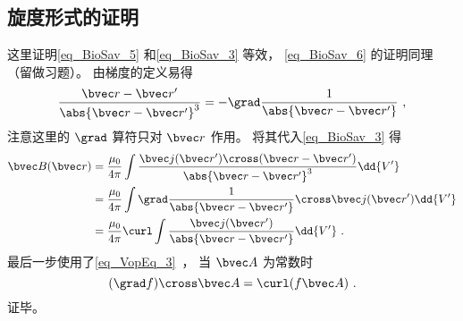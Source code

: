\subsection{旋度形式的证明}
这里证明\autoref{eq_BioSav_5} 和\autoref{eq_BioSav_3} 等效， \autoref{eq_BioSav_6} 的证明同理（留做习题）。 由梯度的定义易得
\begin{equation}
\frac{\bvec r - \bvec r'}{\abs{\bvec r - \bvec r'}^3} = -\grad \frac{1}{\abs{\bvec r - \bvec r'}}~,
\end{equation}
注意这里的 $\grad$ 算符只对 $\bvec r $ 作用。 将其代入\autoref{eq_BioSav_3} 得
\begin{equation}
\begin{aligned}
\bvec B(\bvec r) &= \frac{\mu_0}{4\pi} \int \frac{\bvec j(\bvec r') \cross (\bvec r - \bvec r')}{\abs{\bvec r - \bvec r'}^3} \dd{V'}\\
&= \frac{\mu_0}{4\pi} \int \grad \frac{1}{\abs{\bvec r - \bvec r'}} \cross \bvec j(\bvec r') \dd{V'}\\
&= \frac{\mu_0}{4\pi} \curl \int \frac{\bvec j(\bvec r')}{\abs{\bvec r - \bvec r'}} \dd{V'}~.
\end{aligned}
\end{equation}
最后一步使用了\autoref{eq_VopEq_3}~， 当 $\bvec A$ 为常数时
\begin{equation}
(\grad f) \cross\bvec A = \curl(f\bvec A)~.
\end{equation}
证毕。
